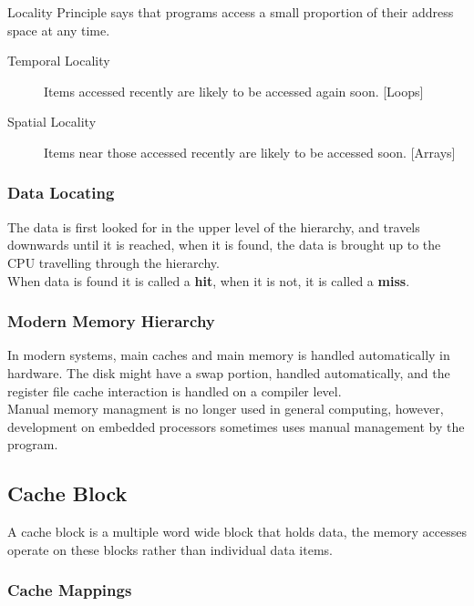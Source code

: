 \documentclass[11pt,a4paper,twocolumn]{book}
\begin{document}
Locality Principle says that programs access a small proportion of their address space at any time.

\begin{description}
\item[Temporal Locality] Items accessed recently are likely to be accessed again soon. [Loops]
\item[Spatial Locality] Items near those accessed recently are likely to be accessed soon. [Arrays]
\end{description}

\subsubsection{Data Locating}

The data is first looked for in the upper level of the hierarchy, and travels downwards until it is reached, when it is found, the data is brought up to the CPU travelling through the hierarchy.\\

When data is found it is called a \textbf{hit}, when it is not, it is called a \textbf{miss}.

\subsubsection{Modern Memory Hierarchy}

In modern systems, main caches and main memory is handled automatically in hardware. The disk might have a swap portion, handled automatically, and the register file cache interaction is handled on a compiler level.\\

Manual memory managment is no longer used in general computing, however, development on embedded processors sometimes uses manual management by the program.\\

\subsection{Cache Block}

A cache block is a multiple word wide block that  holds data, the memory accesses operate on these blocks rather than individual data items.

\subsubsection{Cache Mappings}
\end{document}
